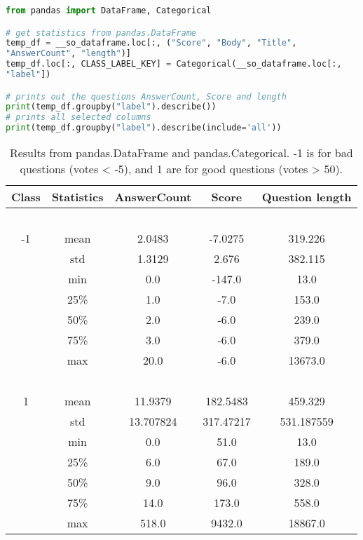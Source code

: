 \begin{lstlisting}[caption={Getting Categorical data from pandas.DataFrame}, 
label={lst:pandas_categorical}, language={Python}, basicstyle=\small] 
from pandas import DataFrame, Categorical

# get statistics from pandas.DataFrame
temp_df = __so_dataframe.loc[:, ("Score", "Body", "Title", 
"AnswerCount", "length")]
temp_df.loc[:, CLASS_LABEL_KEY] = Categorical(__so_dataframe.loc[:, 
"label"])

# prints out the questions AnswerCount, Score and length
print(temp_df.groupby("label").describe())
# prints all selected columns
print(temp_df.groupby("label").describe(include='all'))
\end{lstlisting}
\begin{table}[h]%
	\centering
	\begin{tabular}{| c | c | c | c |c |}
		\hline
		Class 		& Statistics	& AnswerCount		& Score 		& Question length 	\\ \hline
		~ 			& ~ 			& ~  				& ~ 			& ~					\\ \hline
		-1 			& mean 		& 2.0483 			& -7.0275 		& 319.226 		\\ \hline
		~ 			& std 		& 1.3129 			& 2.676 		& 382.115  		\\ \hline
		~ 			& min 		& 0.0 				& -147.0 		& 13.0  		\\ \hline
		~ 			& 25\% 		& 1.0 				& -7.0 			& 153.0 		\\ \hline
		~ 			& 50\% 		& 2.0 				& -6.0 			& 239.0  		\\ \hline
		~ 			& 75\% 		& 3.0 				& -6.0 			& 379.0  		\\ \hline
		~ 			& max 		& 20.0 				& -6.0 			& 13673.0  		\\ \hline
		~ 			& ~ 		& ~  				& ~ 			& ~				\\ \hline
		1 			& mean 		& 11.9379 			& 182.5483 		& 459.329		\\ \hline
		~ 			& std 		& 13.707824			& 317.47217 	& 531.187559  		\\ \hline
		~ 			& min 		& 0.0 				& 51.0 			& 13.0  		\\ \hline
		~ 			& 25\% 		& 6.0 				& 67.0 			& 189.0 		\\ \hline
		~ 			& 50\% 		& 9.0 				& 96.0 			& 328.0  		\\ \hline
		~ 			& 75\% 		& 14.0 				& 173.0 		& 558.0  		\\ \hline
		~ 			& max 		& 518.0 			& 9432.0 		& 18867.0  		\\ \hline
		
	\end{tabular}
	\caption{Results from pandas.DataFrame and pandas.Categorical. -1 is for bad questions (votes < -5), 
		and 1 are for good questions (votes > 50).}
	\label{tab:pandas_categorical}
\end{table}

